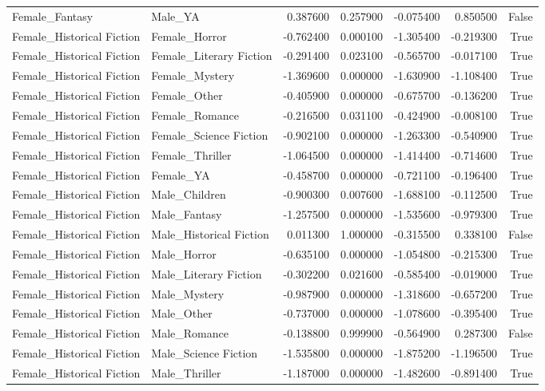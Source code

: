 \begin{tabular}{llrrrrr}
Female_Fantasy & Male_YA & 0.387600 & 0.257900 & -0.075400 & 0.850500 & False \\
Female_Historical Fiction & Female_Horror & -0.762400 & 0.000100 & -1.305400 & -0.219300 & True \\
Female_Historical Fiction & Female_Literary Fiction & -0.291400 & 0.023100 & -0.565700 & -0.017100 & True \\
Female_Historical Fiction & Female_Mystery & -1.369600 & 0.000000 & -1.630900 & -1.108400 & True \\
Female_Historical Fiction & Female_Other & -0.405900 & 0.000000 & -0.675700 & -0.136200 & True \\
Female_Historical Fiction & Female_Romance & -0.216500 & 0.031100 & -0.424900 & -0.008100 & True \\
Female_Historical Fiction & Female_Science Fiction & -0.902100 & 0.000000 & -1.263300 & -0.540900 & True \\
Female_Historical Fiction & Female_Thriller & -1.064500 & 0.000000 & -1.414400 & -0.714600 & True \\
Female_Historical Fiction & Female_YA & -0.458700 & 0.000000 & -0.721100 & -0.196400 & True \\
Female_Historical Fiction & Male_Children & -0.900300 & 0.007600 & -1.688100 & -0.112500 & True \\
Female_Historical Fiction & Male_Fantasy & -1.257500 & 0.000000 & -1.535600 & -0.979300 & True \\
Female_Historical Fiction & Male_Historical Fiction & 0.011300 & 1.000000 & -0.315500 & 0.338100 & False \\
Female_Historical Fiction & Male_Horror & -0.635100 & 0.000000 & -1.054800 & -0.215300 & True \\
Female_Historical Fiction & Male_Literary Fiction & -0.302200 & 0.021600 & -0.585400 & -0.019000 & True \\
Female_Historical Fiction & Male_Mystery & -0.987900 & 0.000000 & -1.318600 & -0.657200 & True \\
Female_Historical Fiction & Male_Other & -0.737000 & 0.000000 & -1.078600 & -0.395400 & True \\
Female_Historical Fiction & Male_Romance & -0.138800 & 0.999900 & -0.564900 & 0.287300 & False \\
Female_Historical Fiction & Male_Science Fiction & -1.535800 & 0.000000 & -1.875200 & -1.196500 & True \\
Female_Historical Fiction & Male_Thriller & -1.187000 & 0.000000 & -1.482600 & -0.891400 & True \\

\end{tabular}
